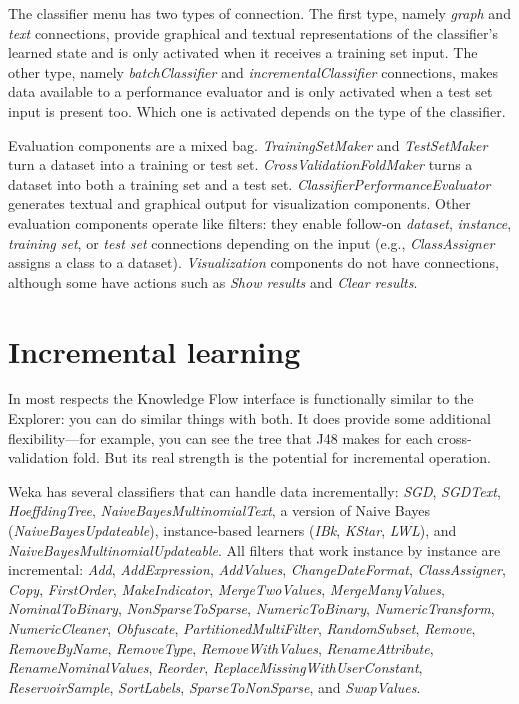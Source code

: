 The classifier menu has two types of connection. The first type,
namely \textit{graph} and \textit{text} connections, provide graphical
and textual representations of the classifier's learned state and is
only activated when it receives a training set input. The other type,
namely \textit{batchClassifier} and \textit{incrementalClassifier}
connections, makes data available to a performance evaluator and is
only activated when a test set input is present too. Which one is
activated depends on the type of the classifier.

Evaluation components are a mixed bag. \textit{TrainingSetMaker} and
\textit{TestSetMaker} turn a dataset into a training or test
set. \textit{CrossValidationFoldMaker} turns a dataset into both a
training set and a test set. \textit{ClassifierPerformanceEvaluator}
generates textual and graphical output for visualization
components. Other evaluation components operate like filters: they
enable follow-on \textit{dataset}, \textit{instance}, \textit{training
set}, or \textit{test set} connections depending on the input (e.g.,
\textit{ClassAssigner} assigns a class to a dataset). \textit{Visualization} components
do not have connections, although some have actions such
as \textit{Show results} and \textit{Clear results}.

\section{Incremental learning}

In most respects the Knowledge Flow interface is functionally similar
to the Explorer: you can do similar things with both. It does provide
some additional flexibility—for example, you can see the tree that J48
makes for each cross-validation fold. But its real strength is the
potential for incremental operation.

Weka has several classifiers that can handle data incrementally: \textit{SGD},
\textit{SGDText}, \textit{HoeffdingTree}, \textit{NaiveBayesMultinomialText}, a version of Naive
Bayes (\textit{NaiveBayesUpdateable}), instance-based learners (\textit{IBk}, \textit{KStar},
\textit{LWL}), and \textit{NaiveBayesMultinomialUpdateable}. All filters that work
instance by instance are
incremental: \textit{Add}, \textit{AddExpression}, \textit{AddValues},
\textit{ChangeDateFormat}, \textit{ClassAssigner}, \textit{Copy}, \textit{FirstOrder}, \textit{MakeIndicator},
\textit{MergeTwoValues}, \textit{MergeManyValues}, \textit{NominalToBinary}, \textit{NonSparseToSparse},
\textit{NumericToBinary}, \textit{NumericTransform}, \textit{NumericCleaner}, \textit{Obfuscate},
\textit{PartitionedMultiFilter}, \textit{RandomSubset}, \textit{Remove}, \textit{RemoveByName},
\textit{RemoveType}, \textit{RemoveWithValues}, \textit{RenameAttribute}, \textit{RenameNominalValues},
\textit{Reorder}, \textit{ReplaceMissingWithUserConstant}, \textit{ReservoirSample}, \textit{SortLabels},
\textit{SparseToNonSparse}, and \textit{SwapValues}.

